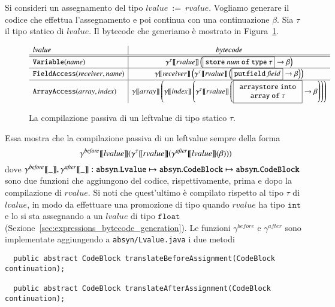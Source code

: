 Si consideri un assegnamento del tipo
$\mathtt{\mathit{lvalue}\ :=\ \mathit{rvalue}}$. Vogliamo generare il codice
che effettua l'assegnamento e poi continua con una continuazione $\beta$.
Sia $\tau$ il tipo statico di $\mathit{lvalue}$. Il bytecode che
generiamo \`e mostrato in Figura~\ref{fig:passive_leftvalues}.
%
\begin{figure}[t]
\[
  \begin{array}{l|c}
    \mathit{lvalue} & \mathit{bytecode} \\\hline\hline
    \mathtt{Variable(\mathit{name})} &
      \gentwo{\tau}{\mathit{rvalue}}\left(\fbox{$\mathtt{store}\ \mathit{num}\ \mathtt{of\ type\ }\tau$}\to\beta\right)\\\hline
    \mathtt{FieldAccess(\mathit{receiver},\mathit{name})} &
      \gen{\mathit{receiver}}\left(
      \gentwo{\tau}{\mathit{rvalue}}\left(\fbox{$\mathtt{putfield}\ \mathit{field}$}\to\beta\right)\right)\\\hline
    \mathtt{ArrayAccess(\mathit{array},\mathit{index})} &
      \gen{\mathit{array}}\left(\gen{\mathit{index}}\left(
      \gentwo{\tau}{\mathit{rvalue}}\left(\fbox{$\begin{array}{c}
      \mathtt{arraystore\ into}\\
      \mathtt{array\ of}\ \tau
      \end{array}$}\to\beta\right)\right)\right)
  \end{array}
\]
\caption{La compilazione passiva di un leftvalue di tipo statico $\tau$.}
  \label{fig:passive_leftvalues}
\end{figure}
%
Essa mostra che la compilazione passiva di un leftvalue \e sempre della forma
\[
  \gamma^\mathit{before}{[\![{\mathit{lvalue}}]\!]}
    ({\gamma^{{\tau}}[\![{\mathit{rvalue}}]\!]}
    (\gamma^\mathit{after}{[\![{\mathit{lvalue}}]\!]}(\beta)))
\]
dove $\gamma^\mathit{before}{[\![{\_}]\!]},\gamma^\mathit{after}{[\![{\_}]\!]}:
\mathtt{absyn.Lvalue}\mapsto
\mathtt{absyn.CodeBlock}\mapsto\mathtt{absyn.CodeBlock}$
sono due funzioni che aggiungono del codice, rispettivamente, prima e dopo
la compilazione di $\mathit{rvalue}$. Si noti che quest'ultimo \`e compilato
rispetto al tipo $\tau$ di $\mathit{lvalue}$, in modo da effettuare una
promozione di tipo quando $\mathit{rvalue}$ ha tipo $\mathtt{int}$ e
lo si sta assegnando a un $\mathit{lvalue}$ di tipo $\mathtt{float}$
(Sezione~\ref{sec:expressions_bytecode_generation}).
Le funzioni $\gamma^\mathit{before}$ e
$\gamma^\mathit{after}$ sono implementate aggiungendo
a \texttt{absyn/Lvalue.java} i due metodi
%
{\small
\begin{verbatim}
  public abstract CodeBlock translateBeforeAssignment(CodeBlock continuation);

  public abstract CodeBlock translateAfterAssignment(CodeBlock continuation);
\end{verbatim}}
